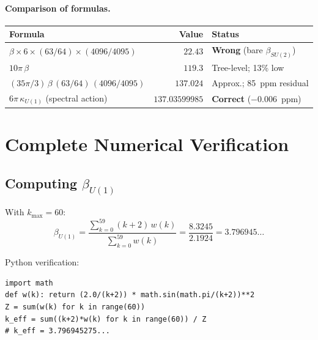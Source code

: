 \documentclass[12pt,a4paper]{article}
\begin{document}
\paragraph{Comparison of formulas.}
\begin{center}
\renewcommand{\arraystretch}{1.4}
\begin{tabular}{lrl}
\toprule
\textbf{Formula} & \textbf{Value} & \textbf{Status} \\
\midrule
$\beta \times 6 \times (63/64) \times (4096/4095)$ & $22.43$ & \textbf{Wrong} (bare $\beta_{SU(2)}$) \\
$10\pi\,\beta$ & $119.3$ & Tree-level; 13\% low \\
$(35\pi/3)\,\beta\,(63/64)\,(4096/4095)$ & $137.024$ & Approx.; 85~ppm residual \\
$6\pi\,\kappa_{U(1)}$ (spectral action) & $137.03599985$ & \textbf{Correct} ($-0.006$~ppm) \\
\bottomrule
\end{tabular}
\end{center}

\section{Complete Numerical Verification}
\label{sec:numerics}

\subsection{Computing $\beta_{U(1)}$}

With $k_{\max} = 60$:
\begin{equation}
\beta_{U(1)} = \frac{\sum_{k=0}^{59}(k+2)\,w(k)}{\sum_{k=0}^{59}w(k)}
= \frac{8.3245}{2.1924} = 3.796945\ldots
\end{equation}

\noindent Python verification:
\begin{verbatim}
import math
def w(k): return (2.0/(k+2)) * math.sin(math.pi/(k+2))**2
Z = sum(w(k) for k in range(60))
k_eff = sum((k+2)*w(k) for k in range(60)) / Z
# k_eff = 3.796945275...
\end{verbatim}

\end{document}
